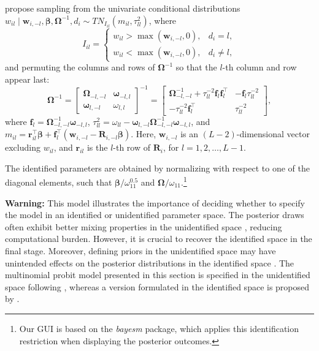 \cite{McCulloch1994} propose sampling from the univariate conditional distributions $w_{il} \mid \bm{w}_{i,-l}, \bm{\beta}, \bm{\Omega}^{-1}, d_i \sim TN_{I_{il}}(m_{il}, \tau_{ll}^2)$, where
\begin{equation*}
	I_{il} =
	\begin{cases}
		w_{il} > \max(\bm{w}_{i,-l}, 0), & d_i = l, \\
		w_{il} < \max(\bm{w}_{i,-l}, 0), & d_i \neq l,
	\end{cases}
\end{equation*}
and permuting the columns and rows of $\bm{\Omega}^{-1}$ so that the $l$-th column and row appear last:
\begin{equation*}
	\bm{\Omega}^{-1} =
	\begin{bmatrix}
		\bm{\Omega}_{-l,-l} & \bm{\omega}_{-l,l} \\
		\bm{\omega}_{l,-l} & \omega_{l,l}
	\end{bmatrix}^{-1}
	=
	\begin{bmatrix}
		\bm{\Omega}_{-l,-l}^{-1} + \tau_{ll}^{-2}\bm{f}_l\bm{f}_l^{\top} & -\bm{f}_l\tau_{ll}^{-2} \\
		-\tau_{ll}^{-2}\bm{f}_l^{\top} & \tau_{ll}^{-2}
	\end{bmatrix},
\end{equation*}
where $\bm{f}_l = \bm{\Omega}_{-l,-l}^{-1}\bm{\omega}_{-l,l}$, $\tau_{ll}^2 = \omega_{ll} - \bm{\omega}_{l,-l}\bm{\Omega}_{-l,-l}^{-1}\bm{\omega}_{-l,l}$, and $m_{il} = \bm{r}_{il}^{\top}\bm{\beta} + \bm{f}_l^{\top}(\bm{w}_{i,-l} - \bm{R}_{i,-l}\bm{\beta})$. Here, $\bm{w}_{i,-l}$ is an $(L-2)$-dimensional vector excluding $w_{il}$, and $\bm{r}_{il}$ is the $l$-th row of $\bm{R}_i$, for $l = 1, 2, \dots, L-1$.

The identified parameters are obtained by normalizing with respect to one of the diagonal elements, such that $\bm{\beta}/\omega_{11}^{0.5}$ and $\bm{\Omega}/\omega_{11}$.\footnote{Our GUI is based on the \textit{bayesm} package, which applies this identification restriction when displaying the posterior outcomes.}

\textbf{Warning:} This model illustrates the importance of deciding whether to specify the model in an identified or unidentified parameter space. The posterior draws often exhibit better mixing properties in the unidentified space \cite{mcculloch2000bayesian}, reducing computational burden. However, it is crucial to recover the identified space in the final stage. Moreover, defining priors in the unidentified space may have unintended effects on the posterior distributions in the identified space \cite{nobile2000comment}. The multinomial probit model presented in this section is specified in the unidentified space following \cite{McCulloch1994}, whereas a version formulated in the identified space is proposed by \cite{mcculloch2000bayesian}.\\

